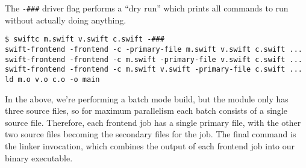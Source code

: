 \documentclass[a4paper,headsepline,bibliography=totoc,toc=flat,fleqn,twoside=semi]{scrbook}
\theoremstyle{definition}
\theoremstyle{definition}
\theoremstyle{definition}
\begin{document}
The \verb|-###| driver flag performs a ``dry run'' which prints all commands to run without actually doing anything.
\begin{Verbatim}
$ swiftc m.swift v.swift c.swift -###
swift-frontend -frontend -c -primary-file m.swift v.swift c.swift ...
swift-frontend -frontend -c m.swift -primary-file v.swift c.swift ...
swift-frontend -frontend -c m.swift v.swift -primary-file c.swift ...
ld m.o v.o c.o -o main
\end{Verbatim}
In the above, we're performing a batch mode build, but the module only has three source files, so for maximum parallelism each batch consists of a single source file. Therefore, each frontend job has a single primary file, with the other two source files becoming the secondary files for the job. The final command is the linker invocation, which combines the output of each frontend job into our binary executable.

\begin{figure}\label{compilerpipeline}
\begin{center}
\end{center}
\end{figure}
\end{document}

